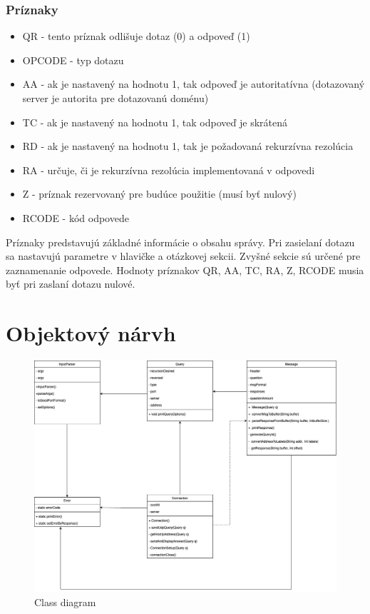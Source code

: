 \subsubsection{Príznaky}
\begin{itemize}
    \item QR - tento príznak odlišuje dotaz (0) a odpoveď (1)
    \item OPCODE - typ dotazu
    \item AA - ak je nastavený na hodnotu 1, tak odpoveď je autoritatívna (dotazovaný server je autorita pre dotazovanú doménu)
    \item TC - ak je nastavený na hodnotu 1, tak odpoveď je skrátená
    \item RD - ak je nastavený na hodnotu 1, tak je požadovaná rekurzívna rezolúcia
    \item RA - určuje, či je rekurzívna rezolúcia implementovaná v odpovedi
    \item Z - príznak rezervovaný pre budúce použitie (musí byť nulový)
    \item RCODE - kód odpovede
\end{itemize}

Príznaky predstavujú základné informácie o obsahu správy.
Pri zasielaní dotazu sa nastavujú parametre v hlavičke a otázkovej sekcii. Zvyšné sekcie sú určené pre zaznamenanie odpovede. Hodnoty príznakov
QR, AA, TC, RA, Z, RCODE musia byť pri zaslaní dotazu nulové.

\newpage
\section{Objektový nárvh}
\label{Objektový návrh}

\begin{figure}[H]
    \includegraphics[width=\textwidth]{./template-fig/DNS_resolver.jpg}
    \caption{Class diagram}
    \centering
\end{figure}

